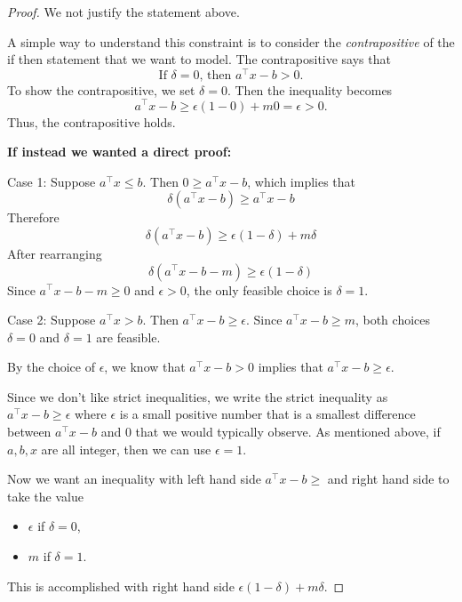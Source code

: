\begin{proof}We not justify the statement above.

A simple way to understand this constraint is to consider the \emph{contrapositive} of the if then statement that we want to model.  The contrapositive says that 
\begin{equation}
\text{If $\delta = 0$, then $a^\top x - b > 0$.}
\end{equation}
To show the contrapositive, we set $\delta = 0$.  Then the inequality becomes 
$$
a^\top x - b \geq \epsilon(1-0) + m0 = \epsilon > 0.
$$
Thus, the contrapositive holds.

\textbf{If instead we wanted a direct proof:}

Case 1: Suppose $a^\top x \leq b$.  Then $0 \geq a^\top x - b$, which implies that 
$$
\delta(a^\top x - b) \geq a^\top x - b
$$
Therefore
$$
\delta(a^\top x - b) \geq \epsilon(1-\delta) + m \delta
$$
After rearranging
$$
\delta(a^\top x - b - m) \geq \epsilon(1-\delta)
$$
Since $a^\top x - b - m \geq 0$ and $\epsilon > 0$, the only feasible choice is $\delta = 1$.


Case 2:  Suppose $a^\top x > b$.  Then $a^\top x - b \geq \epsilon$.    Since $a^\top x -b \geq m$, both choices $\delta = 0$ and $\delta = 1$ are feasible.

By the choice of $\epsilon$,  we know that $a^\top x -b > 0$ implies that $a^\top x - b \geq \epsilon$.  



Since we don't like strict inequalities, we write the strict inequality as $a^\top x - b \geq \epsilon$ where $\epsilon$ is a small positive number that is a smallest difference between $a^\top x - b$ and $0$ that we would typically observe.  As mentioned above, if $a,b,x$ are all integer, then we can use $\epsilon = 1$.

Now we want an inequality with left hand side $a^\top x - b \geq$ and right hand side to take the value 
\begin{itemize}
\item $\epsilon$ if $\delta = 0$,
\item $m$ if $\delta = 1$.
\end{itemize}
This is accomplished with right hand side $\epsilon (1-\delta) + m\delta$.
\end{proof}

